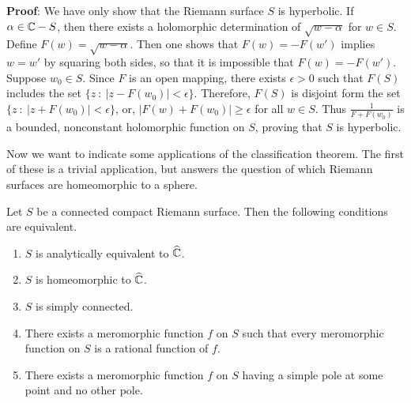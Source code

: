 \documentclass[a4paper,11pt]{article}
\begin{document}
\begin{mdframed}[skipbelow=1ex]
  \textbf{Proof}: 
  We have only show that the Riemann surface $S$ is hyperbolic.  If
  $\alpha \in {\mathbb C} - S$, then there exists a holomorphic determination
  of $\sqrt{w - \alpha}$ for $w \in S$.  Define $F(w) = \sqrt{w -
    \alpha}$.  Then one shows that $F(w) = -F(w')$ implies $w = w'$ by
  squaring both sides, so that it is impossible that $F(w) = -F(w')$.
  Suppose $w_0 \in S$.  Since $F$ is an open mapping, there exists
  $\epsilon > 0$ such that $F(S)$ includes the set $\{ z ~:~ |z -
  F(w_0)| < \epsilon\}$.  Therefore, $F(S)$ is disjoint form the set
  $\{ z ~:~ |z + F(w_0)| < \epsilon \}$, or, $|F(w) + F(w_0)| \ge
  \epsilon$ for all $w \in S$.  Thus $\frac{1}{F + F(w_0)}$ is a
  bounded, nonconstant holomorphic function on $S$, proving that $S$
  is hyperbolic.
\end{mdframed}

Now we want to indicate some applications of the classification
theorem.  The first of these is a trivial application, but answers the
question of which Riemann surfaces are homeomorphic to a sphere.

\begin{thm}
  \label{thm:1}
  Let $S$ be a connected compact Riemann surface.  Then the following
  conditions are equivalent.
  \begin{enumerate}
  \parskip=0pt
  \itemsep=0pt
  \item $S$ is analytically equivalent to $\widehat{{\mathbb C}}$.
  \item $S$ is homeomorphic to $\widehat{{\mathbb C}}$.
  \item $S$ is simply connected.
  \item There exists a meromorphic function $f$ on $S$ such that every
    meromorphic function on $S$ is a rational function of $f$.
  \item There exists a meromorphic function $f$ on $S$ having a simple
    pole at some point and no other pole.
  \end{enumerate}
\end{thm}
\end{document}
